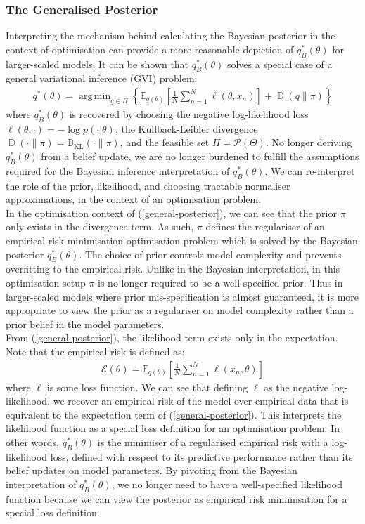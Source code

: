 \documentclass{article}
\newcommand{\KLD}{\operatorname{\mathbb{D}_{KL}}}
\newcommand{\D}{\operatorname{\mathbb{D}}}
\DeclareMathOperator*{\argmin}{arg\,min}
\numberwithin{equation}{section}
\begin{document}
\subsubsection{The Generalised Posterior}
Interpreting the mechanism behind calculating the Bayesian posterior in the context of optimisation can provide a more reasonable depiction of $q_B^*(\theta)$ for larger-scaled models. It can be shown that $q_B^*(\theta)$ solves a special case of a general variational inference (GVI) problem:
\begin{align}
q^*(\theta) = \argmin_{q \in \Pi} \left\{ \mathbb{E}_{q(\theta)}\left[\frac{1}{N}\sum_{n=1}^N \ell(\theta, x_n)\right] + \D(q\|\pi)\right\}
\label{general-posterior}
\end{align}
where $q_B^*(\theta)$ is recovered by choosing the negative log-likelihood loss $\ell(\theta, \cdot) = -\log p(\cdot | \theta)$, the Kullback-Leibler divergence $\D(\cdot \| \pi) = \KLD(\cdot \| \pi)$, and the feasible set $\Pi = \mathcal{P}(\Theta)$. No longer deriving $q_B^*(\theta)$ from a belief update, we are no longer burdened to fulfill the assumptions required for the Bayesian inference interpretation of $q_B^*(\theta)$. We can re-interpret the role of the prior, likelihood, and choosing tractable normaliser approximations, in the context of an optimisation problem.
\\In the optimisation context of (\ref{general-posterior}), we can see that the prior $\pi$ only exists in the divergence term. As such, $\pi$ defines the regulariser of an empirical risk minimisation optimisation problem which is solved by the Bayesian posterior $q_B^*(\theta)$. The choice of prior controls model complexity and prevents overfitting to the empirical risk. Unlike in the Bayesian interpretation, in this optimisation setup $\pi$ is no longer required to be a well-specified prior. Thus in larger-scaled models where prior mis-specification is almost guaranteed, it is more appropriate to view the prior as a regulariser on model complexity rather than a prior belief in the model parameters.
\\From (\ref{general-posterior}), the likelihood term exists only in the expectation. Note that the empirical risk is defined as:
\begin{align}
\mathcal{E}(\theta) = \mathbb{E}_{q(\theta)}\left[\frac{1}{N}\sum_{n=1}^N \ell\left(x_n, \theta\right)\right]
\label{empirical-risk}
\end{align}
where $\ell$ is some loss function. We can see that defining $\ell$ as the negative log-likelihood, we recover an empirical risk of the model over empirical data that is equivalent to the expectation term of (\ref{general-posterior}). This interprets the likelihood function as a special loss definition for an optimisation problem. In other words, $q_B^*(\theta)$ is the minimiser of a regularised empirical risk with a log-likelihood loss, defined with respect to its predictive performance rather than its belief updates on model parameters. By pivoting from the Bayesian interpretation of $q_B^*(\theta)$, we no longer need to have a well-specified likelihood function because we can view the posterior as empirical risk minimisation for a special loss definition.
\end{document}
